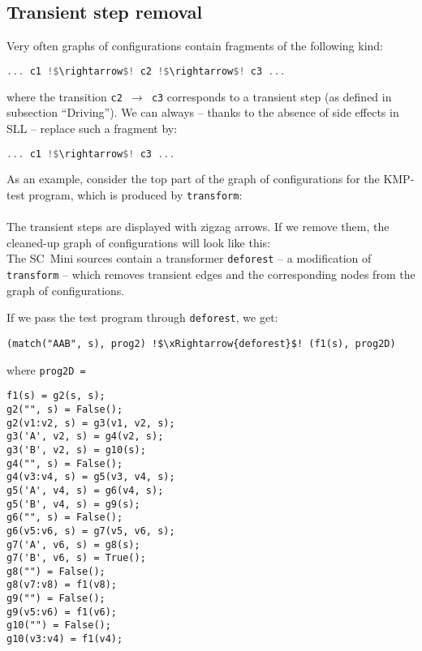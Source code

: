 \subsection{Transient step removal}

Very often graphs of configurations contain fragments of the following kind:
\begin{lstlisting}[language=haskell,escapechar=!]
... c1 !$\rightarrow$! c2 !$\rightarrow$! c3 ...
\end{lstlisting}
where the transition \texttt{c2 $\rightarrow$ c3} corresponds to a transient step 
(as defined in subsection ``Driving'').
We can always -- thanks to the absence of side effects in SLL -- replace such a fragment by:
\begin{lstlisting}[language=haskell,escapechar=!]
... c1 !$\rightarrow$! c3 ...
\end{lstlisting}

As an example, consider the top part of the graph of configurations 
for the KMP-test program, which is produced by 
\texttt{transform}:\\
\\
The transient steps are displayed with zigzag arrows.
If we remove them, the cleaned-up graph of configurations will look like this:\\


The SC~Mini sources contain a transformer \texttt{deforest} -- a modification
of \texttt{transform} -- which removes transient edges and the corresponding nodes
from the graph of configurations.

If we pass the test program through \texttt{deforest}, we get:
\begin{lstlisting}[language=sll,escapechar=!]
(match("AAB", s), prog2) !$\xRightarrow{deforest}$! (f1(s), prog2D)
\end{lstlisting}
where \texttt{prog2D = }
\begin{lstlisting}[language=sll]
f1(s) = g2(s, s);
g2("", s) = False();
g2(v1:v2, s) = g3(v1, v2, s);
g3('A', v2, s) = g4(v2, s);
g3('B', v2, s) = g10(s);
g4("", s) = False();
g4(v3:v4, s) = g5(v3, v4, s);
g5('A', v4, s) = g6(v4, s);
g5('B', v4, s) = g9(s);
g6("", s) = False();
g6(v5:v6, s) = g7(v5, v6, s);
g7('A', v6, s) = g8(s);
g7('B', v6, s) = True();
g8("") = False();
g8(v7:v8) = f1(v8);
g9("") = False();
g9(v5:v6) = f1(v6);
g10("") = False();
g10(v3:v4) = f1(v4);
\end{lstlisting}

